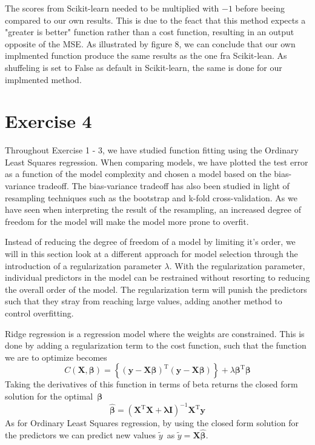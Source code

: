 \documentclass[11pt, a4paper]{article}
\begin{document}
The scores from Scikit-learn needed to be multiplied with $-1$ before beeing compared to our own results. This is due to the feact that this method expects a "greater is better" function rather than a cost function, resulting in an output opposite of the MSE.\cite{Geron2019} As illustrated by figure 8, we can conclude that our own implmented function produce the same results as the one fra Scikit-lean. As shuffeling is set to False as default in Scikit-learn, the same is done for our implmented method. 





\section*{Exercise 4}
Throughout Exercise 1 - 3, we have studied function fitting using the Ordinary Least Squares regression. When comparing models, we have plotted the test error as a function of the model complexity and chosen a model based on the bias-variance tradeoff. The bias-variance tradeoff has also been studied in light of resampling techniques such as the bootstrap and k-fold cross-validation. As we have seen when interpreting the result of the resampling, an increased degree of freedom for the model will make the model more prone to overfit.

Instead of reducing the degree of freedom of a model by limiting it's order, we will in this section look at a different approach for model selection through the introduction of a regularization parameter $\lambda$. With the regularization parameter, individual predictors in the model can be restrained without resorting to reducing the overall order of the model. The regularization term will punish the predictors such that they stray from reaching large values, adding another method to control overfitting. \cite{Bishop2016}

Ridge regression is a regression model where the weights are constrained. \cite{Geron2019} This is done by adding a regularization term to the cost function, such that the function we are to optimize becomes
\[
  C\left(\bm{X},\bm{\beta}\right) = \left\{\left(\bm{y}-\bm{X}\bm{\beta}\right)^\text{T}\left(\bm{y}-\bm{X}\bm{\beta}\right)\right\}+\lambda\bm{\beta}^\text{T}\bm{\beta}
\]
Taking the derivatives of this function in terms of beta returns the closed form solution for the optimal $\bm{\beta}$
\[
  \bm{\hat{\beta}} = \left(\bm{X}^\text{T}\bm{X} + \bm{\lambda}\bm{I}\right)^{-1}\bm{X}^\text{T}\bm{y}
\]
As for Ordinary Least Squares regression, by using the closed form solution for the predictors we can predict new values $\tilde{y}$ as $\tilde{y} = \bm{X}\bm{\hat{\beta}}$.
\end{document}

